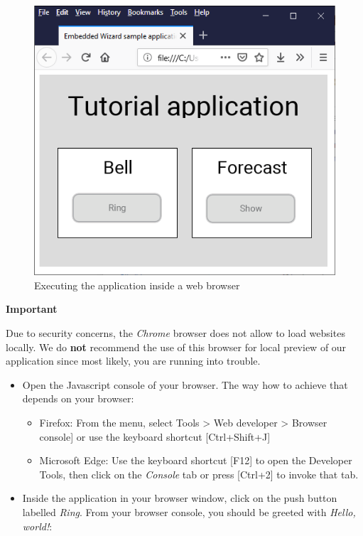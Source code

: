 \documentclass[
  a4paper,
,tablecaptionabove
]{scrbook}
\renewenvironment{quote}{\begin{customblockquote}\list{}{\rightmargin=0em\leftmargin=0em}%
\item\relax\color{blockquote-text}\ignorespaces}{\unskip\unskip\endlist\end{customblockquote}}
\begin{document}
\begin{figure}
\centering
\includegraphics{./../asciidoc/modules/ROOT/assets/images/deviceintegration/ApplicationRunBrowser.png}
\caption{Executing the application inside a web browser}
\end{figure}

\begin{quote}
\textbf{Important}

Due to security concerns, the \emph{Chrome} browser does not allow to
load websites locally. We do \textbf{not} recommend the use of this
browser for local preview of our application since most likely, you are
running into trouble.
\end{quote}

\begin{itemize}
\item
  Open the Javascript console of your browser. The way how to achieve
  that depends on your browser:

  \begin{itemize}
  \item
    Firefox: From the menu, select Tools \textgreater{} Web developer
    \textgreater{} Browser console{]} or use the keyboard shortcut
    {[}Ctrl+Shift+J{]}
  \item
    Microsoft Edge: Use the keyboard shortcut {[}F12{]} to open the
    Developer Tools, then click on the \emph{Console} tab or press
    {[}Ctrl+2{]} to invoke that tab.
  \end{itemize}
\item
  Inside the application in your browser window, click on the push
  button labelled \emph{Ring}. From your browser console, you should be
  greeted with \emph{Hello, world!}:
\end{itemize}
\end{document}
